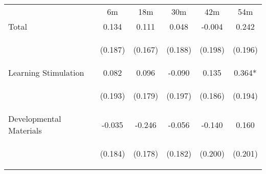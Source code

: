 \begin{tabular}{lccccc}
\hline \noalign{\smallskip} & 6m & 18m & 30m & 42m & 54m\\
\noalign{\smallskip}\hline \noalign{\smallskip}Total & 0.134 & 0.111 & 0.048 & -0.004 & 0.242\\
 & \begin{footnotesize}(0.187)\end{footnotesize} & \begin{footnotesize}(0.167)\end{footnotesize} & \begin{footnotesize}(0.188)\end{footnotesize} & \begin{footnotesize}(0.198)\end{footnotesize} & \begin{footnotesize}(0.196)\end{footnotesize}\\
\noalign{\smallskip}Learning Stimulation & 0.082 & 0.096 & -0.090 & 0.135 & 0.364*\\
 & \begin{footnotesize}(0.193)\end{footnotesize} & \begin{footnotesize}(0.179)\end{footnotesize} & \begin{footnotesize}(0.197)\end{footnotesize} & \begin{footnotesize}(0.186)\end{footnotesize} & \begin{footnotesize}(0.194)\end{footnotesize}\\
\noalign{\smallskip}Developmental Materials & -0.035 & -0.246 & -0.056 & -0.140 & 0.160\\
 & \begin{footnotesize}(0.184)\end{footnotesize} & \begin{footnotesize}(0.178)\end{footnotesize} & \begin{footnotesize}(0.182)\end{footnotesize} & \begin{footnotesize}(0.200)\end{footnotesize} & \begin{footnotesize}(0.201)\end{footnotesize}\\

\end{tabular}

